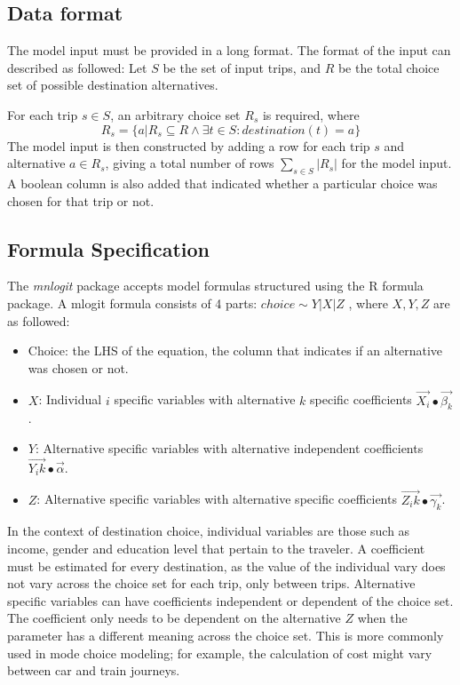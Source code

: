 \subsection{Data format}
The model input must be provided in a long format. The format of the input can described as followed:
Let \(S\)  be the set of input trips, and \(R\)  be the total choice set of possible destination alternatives. 

For each trip $s \in S$, an arbitrary choice set $R_s$ is required, where
$$ R_s  =  \{a | R_s \subseteq R \wedge \exists t \in S : destination(t) = a \} $$ 
The model input is then constructed by adding a row for each trip $s$ and alternative $a \in R_s$, giving a total number of rows  $ \sum_{s \in S} |R_s| $  for the model input. A boolean column is also added that indicated whether a particular choice was chosen for that trip or not.

\subsection{Formula Specification}
The \textit{mnlogit} package accepts model formulas structured using the R formula package. A mlogit formula consists of 4 parts: $ choice \sim Y | X | Z $ , where $X,Y,Z$ are as followed:

\begin{itemize}
	\item Choice: the LHS of the equation, the column that indicates if an alternative was chosen or not.
	\item $X$: Individual $i$ specific variables with alternative $k$ specific coefficients $\vec{X_i} ∙\vec{\beta_k}$.

	\item $Y$: Alternative specific variables with alternative independent coefficients $\vec{Y_ik} ∙\vec{\alpha}$. 
	\item $Z$: Alternative specific variables with alternative specific coefficients
$\vec{Z_ik} ∙\vec{\gamma_k}$.
\end{itemize}

In the context of destination choice, individual variables are those such as income, gender and education level that pertain to the traveler. A coefficient must be estimated for every destination, as the value of the individual vary does not vary across the choice set for each trip, only between trips. Alternative specific variables can have coefficients independent or dependent of the choice set. The coefficient only needs to be dependent on the alternative $Z$ when the parameter has a different meaning across the choice set. This is more commonly used in mode choice modeling; for example, the calculation of cost might vary between car and train journeys.

